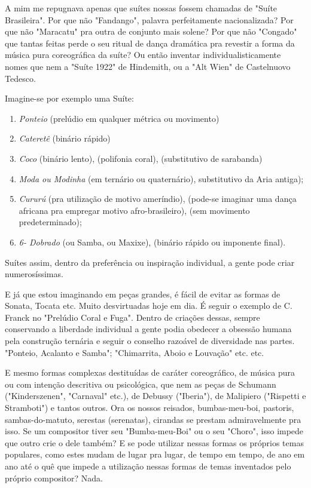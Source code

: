 A mim me repugnava apenas que suítes nossas fossem chamadas de "Suíte
Brasileira". Por que não "Fandango", palavra perfeitamente
nacionalizada? Por que não "Maracatu" pra outra de conjunto mais solene?
Por que não "Congado" que tantas feitas perde o seu ritual de dança
dramática pra revestir a forma da música pura coreográfica da suíte? Ou
então inventar individualisticamente nomes que nem a "Suíte 1922" de
Hindemith, ou a "Alt Wien" de Castelnuovo Tedesco.~

Imagine-se por exemplo uma Suíte:

\begin{enumerate}
\item\emph{Ponteio} (prelúdio em qualquer métrica ou movimento)

\item\emph{Cateretê} (binário rápido)

\item\emph{Coco} (binário lento), (polifonia coral), (substitutivo de sarabanda)

\item\emph{Moda ou Modinha} (em ternário ou quaternário), substitutivo da Aria antiga);

\item\emph{Cururú} (pra utilização de motivo ameríndio), (pode-se imaginar
  uma dança africana pra empregar motivo afro-brasileiro), (sem
  movimento predeterminado);

\item\emph{6- Dobrado} (ou Samba, ou Maxixe), (binário rápido ou imponente final).
\end{enumerate}

Suítes assim, dentro da preferência ou inspiração individual, a gente
pode criar numerosíssimas.

E já que estou imaginando em peças grandes, é fácil de evitar as formas
de Sonata, Tocata etc. Muito desvirtuadas hoje em dia. É seguir o
exemplo de C. Franck no "Prelúdio Coral e Fuga". Dentro de criações
dessas, sempre conservando a liberdade individual a gente podia obedecer
a obsessão humana pela construção ternária e seguir o conselho razoável
de diversidade nas partes. "Ponteio, Acalanto e Samba"; "Chimarrita,
Aboio e Louvação" etc. etc.

E mesmo formas complexas destituídas de caráter coreográfico, de música
pura ou com intenção descritiva ou psicológica, que nem as peças de
Schumann ("Kinderszenen", "Carnaval" etc.), de Debussy ("Iberia"), de
Malipiero ("Rispetti e Stramboti") e tantos outros. Ora os nossos
reisados, bumbas-meu-boi, pastoris, sambas-do-matuto, serestas
(serenatas), cirandas se prestam admiravelmente pra isso. Se um
compositor tiver seu "Bumba-meu-Boi" ou o seu "Choro", isso impede que
outro crie o dele também? E se pode utilizar nessas formas os próprios
temas populares, como estes mudam de lugar pra lugar, de tempo em tempo,
de ano em ano até o quê que impede a utilização nessas formas de temas
inventados pelo próprio compositor? Nada.

